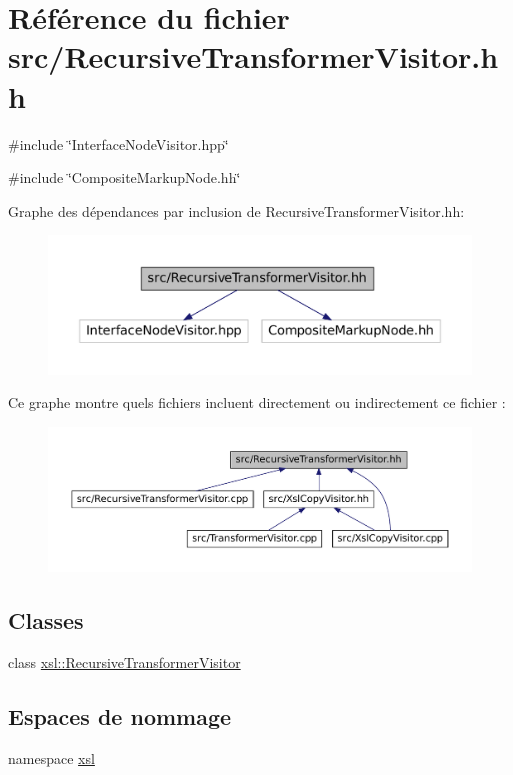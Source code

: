 \hypertarget{_recursive_transformer_visitor_8hh}{
\section{Référence du fichier src/RecursiveTransformerVisitor.hh}
\label{_recursive_transformer_visitor_8hh}
}
{\ttfamily \#include \char`\"{}InterfaceNodeVisitor.hpp\char`\"{}}\par
{\ttfamily \#include \char`\"{}CompositeMarkupNode.hh\char`\"{}}\par
Graphe des dépendances par inclusion de RecursiveTransformerVisitor.hh:
\nopagebreak
\begin{figure}[H]
\begin{center}
\leavevmode
\includegraphics[width=400pt]{_recursive_transformer_visitor_8hh__incl}
\end{center}
\end{figure}
Ce graphe montre quels fichiers incluent directement ou indirectement ce fichier :
\nopagebreak
\begin{figure}[H]
\begin{center}
\leavevmode
\includegraphics[width=400pt]{_recursive_transformer_visitor_8hh__dep__incl}
\end{center}
\end{figure}
\subsection*{Classes}
\begin{DoxyCompactItemize}
\item 
class \hyperlink{classxsl_1_1_recursive_transformer_visitor}{xsl::RecursiveTransformerVisitor}
\end{DoxyCompactItemize}
\subsection*{Espaces de nommage}
\begin{DoxyCompactItemize}
\item 
namespace \hyperlink{namespacexsl}{xsl}
\end{DoxyCompactItemize}
